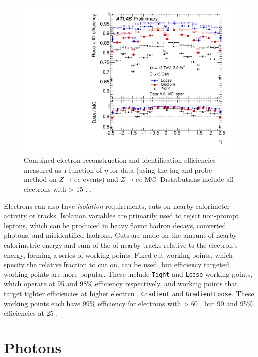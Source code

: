 \begin{centering}
\begin{figure}[!hbt]
\myfloatalign
\includegraphics[width=.90\linewidth]{figures/reco/fig_14b.pdf}
\caption{ Combined electron reconstruction and identification efficiencies measured as a function of $\eta$ for data (using the tag-and-probe method on $Z\rightarrow ee$ events) and $Z\rightarrow ee$ \ac{MC}. Distributions include all electrons with \et > 15 \gev. \cite{ATLAS-CONF-2016-024}.}
\label{fig:reco_el_sf}
\end{figure}
\end{centering}

Electrons can also have \textit{isolation} requirements, cuts on nearby calorimeter activity or tracks. Isolation variables are primarily used to reject non-prompt leptons, which can be produced in heavy flavor hadron decays, converted photons, and misidentified hadrons. Cuts are made on the amount of nearby calorimetric energy and sum of the \pt of nearby tracks relative to the electron's energy, forming a series of working points. Fixed cut working points, which specify the relative fraction to cut on, can be used, but efficiency targeted working points are more popular. These include \texttt{Tight} and \texttt{Loose} working points, which operate at 95 and 98\% efficiency respectively, and working points that target tighter efficiencies at higher electron \pt, \texttt{Gradient} and \texttt{GradientLoose}. These working points each have 99\% efficiency for electrons with \pt > 60 \gev, but 90 and 95\% efficiencies at 25 \gev. 

\section{Photons}
\label{sec:reco_photons}

